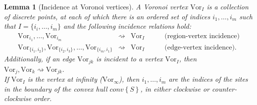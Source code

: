 \documentclass[11pt]{article}
\newtheorem{lemma}{Lemma}
\newcommand{\Sites}{S}
\newcommand{\Vor}{\text{Vor}}
\newcommand{\CHS}{{conv}\left\{\Sites\right\}}
\begin{document}
\begin{lemma}[Incidence at Voronoi vertices]\label{lem:vertexincidence}
	A Voronoi vertex $\Vor_I$ is a collection of discrete points, 
		at each of which there is an ordered set of indices $i_1,\dots,i_m$ 
		such that $I=\{i_i,\dots,i_m\}$ and the following incidence relations hold:
	\begin{eqnarray*}
		\Vor_{i_1},\dots,\Vor_{i_m} &\rightsquigarrow& \Vor_I   ~~~~~~~~~~~~~ \text{(region-vertex incidence)}\\
		\Vor_{\{i_1,i_2\}},\Vor_{\{i_2,i_3\}},\dots,\Vor_{\{i_m,i_1\}} &\rightsquigarrow& \Vor_I ~~~~~~~~~~~~~ \text{(edge-vertex incidence)}.
	\end{eqnarray*}
	Additionally, if an edge $\Vor_{jk}$ is incident to a vertex $\Vor_I$, then $\Vor_j,\Vor_k \rightsquigarrow \Vor_{jk}$.\\
	If $\Vor_I$ is the vertex at infinity ($\Vor_\infty$), then $i_1,\dots,i_m$ 
		are the indices of the sites in the boundary of the convex hull $\CHS$, 
		in either clockwise or counter-clockwise order. \end{lemma}
\end{document}
